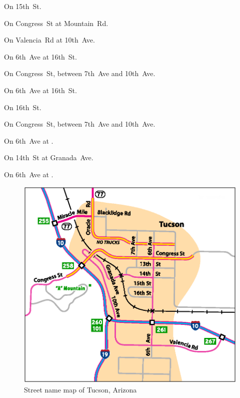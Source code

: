 \pagebreak[3]

\begin{LocationList}

On 15th~St.

On Congress~St at  Mountain~Rd.

On Valencia~Rd at 10th~Ave.

On 6th~Ave at 16th~St.

\Location{\GarageHQ \Garage}
On Congress~St, between 7th~Ave and 10th~Ave.

\Location{\GasStation \Gas}
On 6th~Ave at 16th~St.

On 16th~St.

\Location{\RecruitmentAgency \Recruitment}
On Congress~St, between 7th~Ave and 10th~Ave.

On 6th~Ave at  .

On 14th~St at Granada~Ave.

On 6th~Ave at  .

\end{LocationList}

\begin{figure}[p!]
\includegraphics[scale=0.88]{cities/arizona/tucson}
\centering\caption{Street name map of Tucson, Arizona}
\end{figure}
\pagebreak[4]
